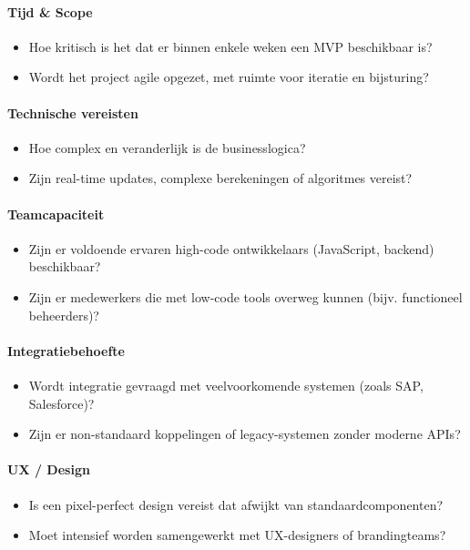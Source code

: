 \paragraph{Tijd \& Scope}
\begin{itemize}
    \item Hoe kritisch is het dat er binnen enkele weken een MVP beschikbaar is?
    \item Wordt het project agile opgezet, met ruimte voor iteratie en bijsturing?
\end{itemize}

\paragraph{Technische vereisten}
\begin{itemize}
    \item Hoe complex en veranderlijk is de businesslogica?
    \item Zijn real-time updates, complexe berekeningen of algoritmes vereist?
\end{itemize}

\paragraph{Teamcapaciteit}
\begin{itemize}
    \item Zijn er voldoende ervaren high-code ontwikkelaars (JavaScript, backend) beschikbaar?
    \item Zijn er medewerkers die met low-code tools overweg kunnen (bijv. functioneel beheerders)?
\end{itemize}

\paragraph{Integratiebehoefte}
\begin{itemize}
    \item Wordt integratie gevraagd met veelvoorkomende systemen (zoals SAP, Salesforce)?
    \item Zijn er non-standaard koppelingen of legacy-systemen zonder moderne APIs?
\end{itemize}

\paragraph{UX / Design}
\begin{itemize}
    \item Is een pixel-perfect design vereist dat afwijkt van standaardcomponenten?
    \item Moet intensief worden samengewerkt met UX-designers of brandingteams?
\end{itemize}

